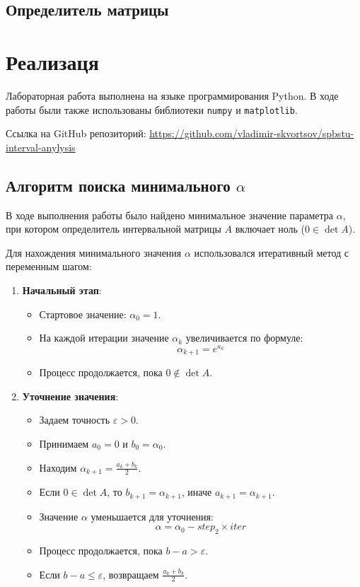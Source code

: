 \documentclass{article}
\begin{document}
  \subsection{Определитель матрицы}

  \section{Реализаця}

  Лабораторная работа выполнена на языке программирования Python. В ходе
  работы были также использованы библиотеки \verb!numpy! и
  \verb!matplotlib!.

  Ссылка на GitHub репозиторий:
  \href{https://github.com/vladimir-skvortsov/spbstu-interval-anylysis}{https://github.com/vladimir-skvortsov/spbstu-interval-anylysis}

  \subsection{Алгоритм поиска минимального \( \alpha \)}

  В ходе выполнения работы было найдено минимальное значение параметра
  \( \alpha \), при котором определитель интервальной матрицы \( A \)
  включает ноль (\( 0 \in \det A \)).

  Для нахождения минимального значения \(\alpha\) использовался
  итеративный метод с переменным шагом:

  \begin{enumerate}
    \item \textbf{Начальный этап}:
      \begin{itemize}
        \item Стартовое значение: \(\alpha_0 = 1\).
        \item На каждой итерации значение \( \alpha_k \) увеличивается по формуле:
          \[ \alpha_{k+1} = e^{a_k} \]
        \item Процесс продолжается, пока \( 0 \notin \det A \).
      \end{itemize}

    \item \textbf{Уточнение значения}:
      \begin{itemize}
        \item Задаем точность \( \varepsilon > 0 \).
        \item Принимаем \( a_0 = 0 \) и \( b_0 = \alpha_0 \).
        \item Находим \( \alpha_{k+1} = \frac{a_k + b_k}{2} \).
        \item Если \( 0 \in \det A \), то \( b_{k+1} = \alpha_{k+1} \),
          иначе \( a_{k+1} = \alpha_{k+1} \).
        \item Значение \(\alpha\) уменьшается для уточнения:
          \[ \alpha = \alpha_0 - step_2 \times iter \]
        \item Процесс продолжается, пока \( b - a > \varepsilon \).
        \item Если \( b - a \leqslant \varepsilon \), возвращаем
          \( \frac{a_k + b_k}{2} \).
      \end{itemize}
  \end{enumerate}
\end{document}
